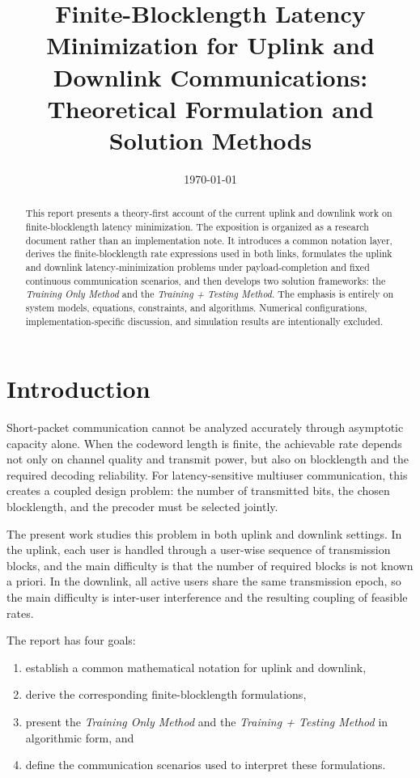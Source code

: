 \documentclass[11pt]{article}
\title{Finite-Blocklength Latency Minimization for Uplink and Downlink Communications:\\Theoretical Formulation and Solution Methods}
\author{}
\date{\today}
\begin{document}
\maketitle

\begin{abstract}
This report presents a theory-first account of the current uplink and downlink
work on finite-blocklength latency minimization. The exposition is organized as
a research document rather than an implementation note. It introduces a common
notation layer, derives the finite-blocklength rate expressions used in both
links, formulates the uplink and downlink latency-minimization problems under
payload-completion and fixed continuous communication scenarios, and then
develops two solution frameworks: the \emph{Training Only Method} and the
\emph{Training + Testing Method}. The emphasis is entirely on system models,
equations, constraints, and algorithms. Numerical configurations,
implementation-specific discussion, and simulation results are intentionally
excluded.
\end{abstract}

\section{Introduction}

Short-packet communication cannot be analyzed accurately through asymptotic
capacity alone. When the codeword length is finite, the achievable rate depends
not only on channel quality and transmit power, but also on blocklength and the
required decoding reliability. For latency-sensitive multiuser communication,
this creates a coupled design problem: the number of transmitted bits, the
chosen blocklength, and the precoder must be selected jointly.

The present work studies this problem in both uplink and downlink settings. In
the uplink, each user is handled through a user-wise sequence of transmission
blocks, and the main difficulty is that the number of required blocks is not
known a priori. In the downlink, all active users share the same transmission
epoch, so the main difficulty is inter-user interference and the resulting
coupling of feasible rates.

The report has four goals:
\begin{enumerate}
    \item establish a common mathematical notation for uplink and downlink,
    \item derive the corresponding finite-blocklength formulations,
    \item present the \emph{Training Only Method} and the \emph{Training + Testing Method} in algorithmic form, and
    \item define the communication scenarios used to interpret these formulations.
\end{enumerate}
\end{document}
